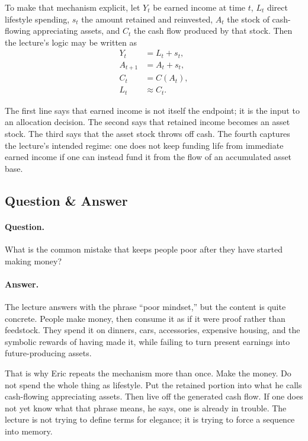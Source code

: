 To make that mechanism explicit, let \(Y_t\) be earned income at time \(t\), \(L_t\) direct lifestyle spending, \(s_t\) the amount retained and reinvested, \(A_t\) the stock of cash-flowing appreciating assets, and \(C_t\) the cash flow produced by that stock. Then the lecture's logic may be written as
\begin{align}
Y_t &= L_t + s_t,\\
A_{t+1} &= A_t + s_t,\\
C_t &= C(A_t),\\
L_t &\approx C_t.
\end{align}

The first line says that earned income is not itself the endpoint; it is the input to an allocation decision. The second says that retained income becomes an asset stock. The third says that the asset stock throws off cash. The fourth captures the lecture's intended regime: one does not keep funding life from immediate earned income if one can instead fund it from the flow of an accumulated asset base.

\subsection{Question \& Answer}

\paragraph{Question.} What is the common mistake that keeps people poor after they have started making money?

\paragraph{Answer.} The lecture answers with the phrase ``poor mindset,'' but the content is quite concrete. People make money, then consume it as if it were proof rather than feedstock. They spend it on dinners, cars, accessories, expensive housing, and the symbolic rewards of having made it, while failing to turn present earnings into future-producing assets.

That is why Eric repeats the mechanism more than once. Make the money. Do not spend the whole thing as lifestyle. Put the retained portion into what he calls cash-flowing appreciating assets. Then live off the generated cash flow. If one does not yet know what that phrase means, he says, one is already in trouble. The lecture is not trying to define terms for elegance; it is trying to force a sequence into memory.

